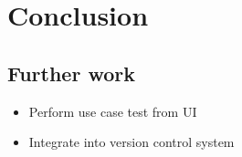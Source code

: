 \chapter{Conclusion}

\section{Further work}
\begin{itemize}
  \item Perform use case test from UI
  \item Integrate into version control system
\end{itemize}